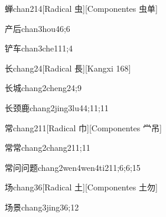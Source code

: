\begin{verbete}{蝉}{chan2}{14}[Radical 虫][Componentes 虫单]
\end{verbete}

\begin{verbete}{产后}{chan3hou4}{6;6}
\end{verbete}

\begin{verbete}{铲车}{chan3che1}{11;4}
\end{verbete}

\begin{verbete}{长}{chang2}{4}[Radical 長][Kangxi 168]
\end{verbete}

\begin{verbete}{长城}{chang2cheng2}{4;9}
\end{verbete}

\begin{verbete}{长颈鹿}{chang2jing3lu4}{4;11;11}
\end{verbete}

\begin{verbete}{常}{chang2}{11}[Radical 巾][Componentes 龸吊]
\end{verbete}

\begin{verbete}{常常}{chang2chang2}{11;11}
\end{verbete}

\begin{verbete}{常问问题}{chang2wen4wen4ti2}{11;6;6;15}
\end{verbete}

\begin{verbete}{场}{chang3}{6}[Radical ⼟][Componentes ⼟勿]
\end{verbete}

\begin{verbete}{场景}{chang3jing3}{6;12}
\end{verbete}

